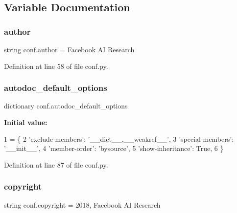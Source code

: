 \subsection{Variable Documentation}
\mbox{\label{namespaceconf_a637c239d256432248aa8d9f3ab0b8c52}} 
\subsubsection{\texorpdfstring{author}{author}}
{\footnotesize\ttfamily string conf.\+author = \textquotesingle{}Facebook AI Research\textquotesingle{}}



Definition at line 58 of file conf.\+py.

\mbox{\label{namespaceconf_ae1323788e132618f5d7b9839f2adc5e3}} 
\subsubsection{\texorpdfstring{autodoc\+\_\+default\+\_\+options}{autodoc\_default\_options}}
{\footnotesize\ttfamily dictionary conf.\+autodoc\+\_\+default\+\_\+options}

{\bfseries Initial value\+:}
\begin{DoxyCode}
1 =  \{
2     \textcolor{stringliteral}{'exclude-members'}: \textcolor{stringliteral}{'\_\_dict\_\_,\_\_weakref\_\_'},
3     \textcolor{stringliteral}{'special-members'}: \textcolor{stringliteral}{'\_\_init\_\_'},
4     \textcolor{stringliteral}{'member-order'}: \textcolor{stringliteral}{'bysource'},
5     \textcolor{stringliteral}{'show-inheritance'}: \textcolor{keyword}{True},
6 \}
\end{DoxyCode}


Definition at line 87 of file conf.\+py.

\mbox{\label{namespaceconf_a33fa97cf51dcb25970fbf53f10159589}} 
\subsubsection{\texorpdfstring{copyright}{copyright}}
{\footnotesize\ttfamily string conf.\+copyright = \textquotesingle{}2018, Facebook AI Research\textquotesingle{}}



